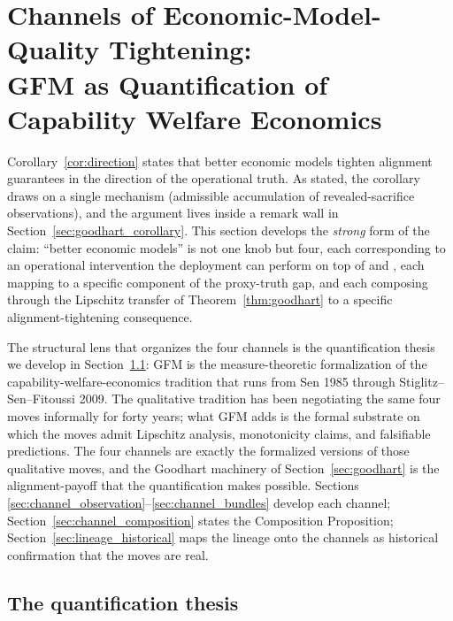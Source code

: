 \section{Channels of Economic-Model-Quality Tightening:\\
GFM as Quantification of Capability Welfare Economics}
\label{sec:lineage}

Corollary~\ref{cor:direction} states that better economic
models tighten alignment guarantees in the direction of the
operational truth.  As stated, the corollary draws on a single
mechanism (admissible accumulation of revealed-sacrifice
observations), and the argument lives inside a remark wall in
Section~\ref{sec:goodhart_corollary}.  This section develops the
\emph{strong} form of the claim: ``better economic models'' is not
one knob but four, each corresponding to an operational intervention
the deployment can perform on top of \citep[Revealed
Sacrifice]{lasser2026paper8a} and \citep[Need
Sufficiency]{lasser2026paper8b}, each mapping to a specific
component of the proxy-truth gap, and each composing through the
Lipschitz transfer of Theorem~\ref{thm:goodhart} to a
specific alignment-tightening consequence.

The structural lens that organizes the four channels is the
quantification thesis we develop in
Section~\ref{sec:quantification_thesis}: GFM is the
measure-theoretic formalization of the capability-welfare-economics
tradition that runs from Sen 1985 through Stiglitz--Sen--Fitoussi
2009.  The qualitative tradition has been negotiating the same four
moves informally for forty years; what GFM adds is the formal
substrate on which the moves admit Lipschitz analysis,
monotonicity claims, and falsifiable predictions.  The four channels
are exactly the formalized versions of those qualitative moves, and
the Goodhart machinery of Section~\ref{sec:goodhart} is the
alignment-payoff that the quantification makes possible.  Sections
\ref{sec:channel_observation}--\ref{sec:channel_bundles} develop
each channel; Section~\ref{sec:channel_composition} states the
Composition Proposition; Section~\ref{sec:lineage_historical} maps
the lineage onto the channels as historical confirmation that the
moves are real.

\subsection{The quantification thesis}
\label{sec:quantification_thesis}

